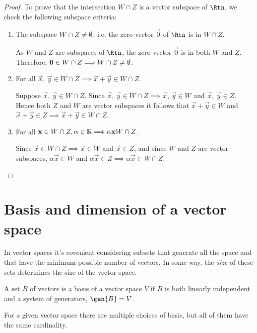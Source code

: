\begin{proof}
    To prove that the intersection $W\cap Z$ is a vector subspace of $\Rtn$, we check the following subspace
    criteria:

    \begin{enumerate}
        \item The subspace $W\cap Z\neq \emptyset$; i.e. the zero vector $\vec{0}$ of $\Rtn$ is in $W\cap Z$.

            As $W$ and $Z$ are subspaces of $\Rtn$, the zero vector $\vec{0}$ is in both $W$ and $Z$.
            Therefore, $\mathbf{0}\in W\cap Z\Longrightarrow W\cap Z\neq\emptyset$.

        \item For all $\vec{x}$, $\vec{y}\in W\cap Z\implies \vec{x} + \vec{y}\in W\cap Z$.

            Suppose $\vec{x}$, $\vec{y}\in W\cap Z$. Since $\vec{x}$, $\vec{y}\in W\cap Z\implies \vec{x}$,
            $\vec{y}\in W$ and $\vec{x}$, $\vec{y}\in Z$. Hence both $Z$ and $W$ are vector subspaces it
            follows that $\vec{x} + \vec{y}\in W$ and $\vec{x} + \vec{y}\in Z\implies \vec{x} + \vec{y}\in
            W\cap Z$.

        \item For all $\mathbf{x}\in W\cap Z, \alpha\in\mathbb{R}\Longrightarrow \alpha\mathbf{x} W\cap Z$.

            Since $\vec{x}\in W\cap Z\implies \vec{x}\in W$ and $\vec{x}\in Z$, and since $W$ and $Z$ are
            vector subspaces, $\alpha\vec{x}\in W$ and $\alpha\vec{x}\in Z\implies \alpha\vec{x}\in W\cap Z$.
    \end{enumerate}
\end{proof}

\section{Basis and dimension of a vector space}
In vector spaces it's covenient considering subsets that generate all the space and that have the minimum
possible number of vectors. In some way, the \textit{size} of these sets determines the size of the vector
space.

\begin{defi}[Basis]
    A set $B$ of vectors is a basis of a vector space $V$ if $B$ is both linearly independent and a system of
    generators, $\gen{B} = V$.
\end{defi}

\begin{remark}
    For a given vector space there are multiple choices of basis, but all of them have the same cardinality.
\end{remark}

